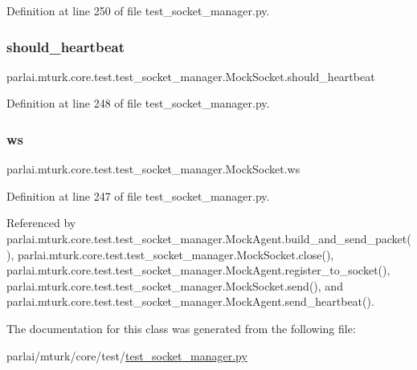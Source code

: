Definition at line 250 of file test\+\_\+socket\+\_\+manager.\+py.

\mbox{\label{classparlai_1_1mturk_1_1core_1_1test_1_1test__socket__manager_1_1MockSocket_a5ea30f810f115aa211cc2b61356e1cde}} 
\subsubsection{\texorpdfstring{should\+\_\+heartbeat}{should\_heartbeat}}
{\footnotesize\ttfamily parlai.\+mturk.\+core.\+test.\+test\+\_\+socket\+\_\+manager.\+Mock\+Socket.\+should\+\_\+heartbeat}



Definition at line 248 of file test\+\_\+socket\+\_\+manager.\+py.

\mbox{\label{classparlai_1_1mturk_1_1core_1_1test_1_1test__socket__manager_1_1MockSocket_ae2988bb7b53c335c9bdda34f592ae40c}} 
\subsubsection{\texorpdfstring{ws}{ws}}
{\footnotesize\ttfamily parlai.\+mturk.\+core.\+test.\+test\+\_\+socket\+\_\+manager.\+Mock\+Socket.\+ws}



Definition at line 247 of file test\+\_\+socket\+\_\+manager.\+py.



Referenced by parlai.\+mturk.\+core.\+test.\+test\+\_\+socket\+\_\+manager.\+Mock\+Agent.\+build\+\_\+and\+\_\+send\+\_\+packet(), parlai.\+mturk.\+core.\+test.\+test\+\_\+socket\+\_\+manager.\+Mock\+Socket.\+close(), parlai.\+mturk.\+core.\+test.\+test\+\_\+socket\+\_\+manager.\+Mock\+Agent.\+register\+\_\+to\+\_\+socket(), parlai.\+mturk.\+core.\+test.\+test\+\_\+socket\+\_\+manager.\+Mock\+Socket.\+send(), and parlai.\+mturk.\+core.\+test.\+test\+\_\+socket\+\_\+manager.\+Mock\+Agent.\+send\+\_\+heartbeat().



The documentation for this class was generated from the following file\+:\begin{DoxyCompactItemize}
\item 
parlai/mturk/core/test/\hyperlink{test_2test__socket__manager_8py}{test\+\_\+socket\+\_\+manager.\+py}\end{DoxyCompactItemize}
